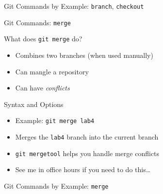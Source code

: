 \documentclass[table,dvipsnames]{beamer}
\begin{document}

\begin{frame}{Git Commands by Example: \texttt{branch}, \texttt{checkout}}
\end{frame}


\begin{frame}{Git Commands: \texttt{merge}}
	\begin{block}{What does \texttt{git merge} do?}
		\begin{itemize}
			\item Combines two branches (when used manually)
			\item Can mangle a repository
			\item Can have \emph{conflicts}
		\end{itemize}
	\end{block}
	\begin{block}{Syntax and Options}
		\begin{itemize}
			\item Example: \texttt{git merge lab4}
			\item Merges the \texttt{lab4} branch into the current branch
			\item \texttt{git mergetool} helps you handle merge conflicts
			\item See me in office hours if you need to do this\dots
		\end{itemize}
	\end{block}
\end{frame}


\begin{frame}{Git Commands by Example: \texttt{merge}}
\end{frame}
\end{document}
